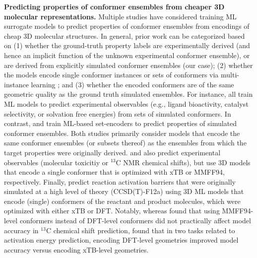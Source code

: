 \textbf{Predicting properties of conformer ensembles from cheaper 3D molecular representations.}
Multiple studies have considered training ML surrogate models to predict properties of conformer ensembles from encodings of cheap 3D molecular structures. In general, prior work can be categorized based on (1) whether the ground-truth property labels are experimentally derived (and hence an implicit function of the unknown experimental conformer ensemble), or are derived from explicitly simulated conformer ensembles (our case); (2) whether the models encode single conformer instances or sets of conformers via multi-instance learning \citep{dietterich1997solving, maron1997framework, ilse2018attention, zankov2024chemical}; and (3) whether the encoded conformers are of the same geometric quality as the ground truth simulated ensembles. For instance, \citet{axelrod2023molecular, zahrt2019prediction, zankov2021qsar, zankov2023multi, weinreich2021machine} all train ML models to predict experimental observables (e.g., ligand bioactivity, catalyst selectivity, or solvation free energies) from sets of simulated conformers. In contrast, \citet{chuang2020attention} and \citet{zhu2023learning} train ML-based set-encoders to predict properties of simulated conformer ensembles. Both studies primarily consider models that encode the same conformer ensembles (or subsets thereof) as the ensembles from which the target properties were originally derived. \citet{cremer2023equivariant} and \citet{guan2021real} also predict experimental observables (molecular toxicitiy or $^{13}$C NMR chemical shifts), but use 3D models that encode a single conformer that is optimized with xTB or MMFF94, respectively. Finally, \citet{van20243dreact} predict reaction activation barriers that were originally simulated at a high level of theory (CCSD(T)-F12a) using 3D ML models that encode (single) conformers of the reactant and product molecules, which were optimized with either xTB or DFT. Notably, whereas \citet{guan2021real} found that using MMFF94-level conformers instead of DFT-level conformers did not practically affect model accuracy in $^{13}$C chemical shift prediction, \citet{van20243dreact} found that in two tasks related to activation energy prediction, encoding DFT-level geometries improved model accuracy versus encoding xTB-level geometries.
